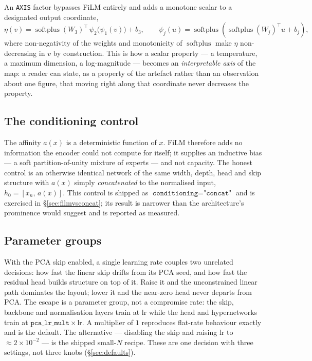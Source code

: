 \documentclass[12pt]{iopart}
\theoremstyle{definition}
\theoremstyle{plain}
\theoremstyle{remark}
\DeclareMathOperator{\softplus}{softplus}
\newcommand{\code}[1]{\texttt{#1}}
\begin{document}
An \code{AXIS} factor bypasses FiLM entirely and adds a monotone scalar to a
designated output coordinate,
\begin{equation}
\label{eq:axis}
\eta(v)
=
\softplus(W_3)^\top\,\psi_2\bigl(\psi_1(v)\bigr) + b_3,
\qquad
\psi_j(u)=\softplus\!\left(\softplus(W_j)^\top u + b_j\right),
\end{equation}
where non-negativity of the weights and monotonicity of $\softplus$ make
$\eta$ non-decreasing in $v$ by construction. This is how a scalar property ---
a temperature, a maximum dimension, a log-magnitude --- becomes an
\emph{interpretable axis} of the map: a reader can state, as a property of the
artefact rather than an observation about one figure, that moving right along
that coordinate never decreases the property.

\subsection{The conditioning control}
\label{sec:concat}

The affinity $a(x)$ is a deterministic function of $x$. FiLM therefore adds no
information the encoder could not compute for itself; it supplies an inductive
bias --- a soft partition-of-unity mixture of experts --- and not capacity. The
honest control is an otherwise identical network of the same width, depth, head
and skip structure with $a(x)$ simply \emph{concatenated} to the normalised
input, $h_0=[x_n,\,a(x)]$. This control is shipped as
$\code{conditioning}=\code{"concat"}$ and is exercised in
\S\ref{sec:filmvsconcat}; its result is narrower than the architecture's
prominence would suggest and is reported as measured.

\subsection{Parameter groups}
\label{sec:paramgroups}

With the PCA skip enabled, a single learning rate couples two unrelated
decisions: how fast the linear skip drifts from its PCA seed, and how fast the
residual head builds structure on top of it. Raise it and the unconstrained
linear path dominates the layout; lower it and the near-zero head never
departs from PCA. The escape is a parameter group, not a compromise rate: the
skip, backbone and normalisation layers train at $\mathrm{lr}$ while the head
and hypernetworks train at $\code{pca\_lr\_mult}\times\mathrm{lr}$. A
multiplier of $1$ reproduces flat-rate behaviour exactly and is the default.
The alternative --- disabling the skip and raising $\mathrm{lr}$ to
$\approx 2\times 10^{-2}$ --- is the shipped small-$N$ recipe. These are one
decision with three settings, not three knobs (\S\ref{sec:defaults}).
\end{document}
